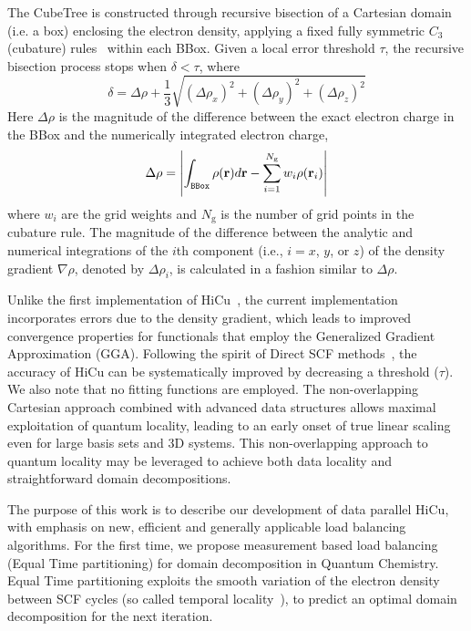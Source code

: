 \commentoutA{\documentclass[prl,aps,twocolumn,showpacs,twocolumngrid,superbib]{revtex4}}
\begin{document}
The CubeTree is constructed through recursive bisection of a Cartesian
domain (i.e. a box) enclosing the electron density, applying a fixed
fully symmetric $C_3$ (cubature) rules~\cite{Stroud71} within each
BBox.  Given a local error threshold $\tau$, the recursive bisection
process stops when $\delta < \tau$, where
\begin{equation}
\delta = \Delta \rho+ \frac{1}{3} \sqrt{(\Delta \rho_x)^2 + (\Delta
\rho_y)^2 + (\Delta \rho_z)^2}
\label{eq:delta}
\end{equation}
Here $\Delta \rho$ is the magnitude of the difference between the
exact electron charge in the BBox and the numerically integrated
electron charge,
\begin{equation}
\Delta \rho = \left|\int_{\tt{BBox}}\rho({\bf r}) d{\bf r} -
\sum_{i=1}^{N_{\mathrm{g}}} w_i\rho({\bf r}_i)\right|
\end{equation}
where $w_i$ are the grid weights and $N_{\mathrm{g}}$ is the number of
grid points in the cubature rule. The magnitude of the difference
between the analytic and numerical integrations of the $i$th component
(i.e., $i = x$, $y$, or $z$) of the density gradient $\nabla \rho$,
denoted by $\Delta \rho_i $, is calculated in a fashion similar to
$\Delta \rho$.

Unlike the first implementation of HiCu~\cite{MChallacombe00A}, the
current implementation incorporates errors due to the density
gradient, which leads to improved convergence properties for
functionals that employ the Generalized Gradient Approximation (GGA).
Following the spirit of Direct SCF methods~\cite{JAlmlof82,MHaser89},
the accuracy of HiCu can be systematically improved by decreasing a
threshold ($\tau$).  We also note that no fitting functions are
employed. The non-overlapping Cartesian approach combined with
advanced data structures allows maximal exploitation of quantum
locality, leading to an early onset of true linear scaling even for
large basis sets and 3D systems.  This non-overlapping approach to
quantum locality may be leveraged to achieve both data locality and
straightforward domain decompositions.

The purpose of this work is to describe our development of data
parallel HiCu, with emphasis on new, efficient and generally
applicable load balancing algorithms.
 For the first time, we propose measurement based load balancing
(Equal Time partitioning) for domain decomposition in Quantum
Chemistry. Equal Time partitioning exploits the smooth variation 
of the electron density between SCF cycles (so called temporal locality~\cite{JPilkington96}), to predict an optimal domain decomposition for
the next iteration.
\end{document}
